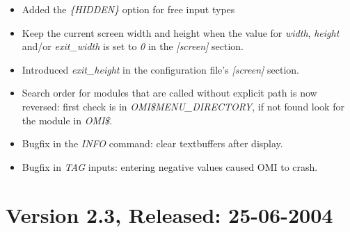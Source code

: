 \documentclass[a4paper]{book}
\begin{document}
\begin{itemize}
\item Added the \textsl{\{HIDDEN\}} option for free input types
\item Keep the current screen width and height when the value for \textsl{width}, \textsl{height} and/or \textsl{exit{\_}width} is set to \textsl{0} in the \textsl{[screen]} section.
\item Introduced \textsl{exit{\_}height} in the configuration file's \textsl{[screen]} section.
\item Search order for modules that are called without explicit path is now reversed: first check is in \textsl{OMI{\$}MENU{\_}DIRECTORY}, if not found look for the module in \textsl{OMI{\$}}.
\item Bugfix in the \textsl{INFO} command: clear textbuffers after display.
\item Bugfix in \textsl{TAG} inputs: entering negative values caused OMI to crash.
\end{itemize}

\section*{Version 2.3, Released: 25-06-2004}
\end{document}
